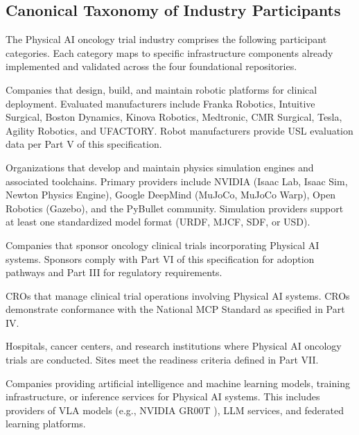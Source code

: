 \documentclass[11pt,letterpaper]{article}
\begin{document}
\subsection{Canonical Taxonomy of Industry Participants}

The Physical AI oncology trial industry comprises the following participant categories. Each category maps to specific infrastructure components already implemented and validated across the four foundational repositories.

\begin{description}[leftmargin=3.5cm, style=sameline]
  \item[Robot Manufacturers] Companies that design, build, and maintain robotic platforms for clinical deployment. Evaluated manufacturers include Franka Robotics, Intuitive Surgical, Boston Dynamics, Kinova Robotics, Medtronic, CMR Surgical, Tesla, Agility Robotics, and UFACTORY. Robot manufacturers \SHALL{} provide USL evaluation data per Part V of this specification.

  \item[Simulation Providers] Organizations that develop and maintain physics simulation engines and associated toolchains. Primary providers include NVIDIA (Isaac Lab, Isaac Sim, Newton Physics Engine), Google DeepMind (MuJoCo, MuJoCo Warp), Open Robotics (Gazebo), and the PyBullet community. Simulation providers \SHALL{} support at least one standardized model format (URDF, MJCF, SDF, or USD).

  \item[Pharmaceutical Sponsors] Companies that sponsor oncology clinical trials incorporating Physical AI systems. Sponsors \SHALL{} comply with Part VI of this specification for adoption pathways and Part III for regulatory requirements.

  \item[Contract Research Organizations] CROs that manage clinical trial operations involving Physical AI systems. CROs \SHALL{} demonstrate conformance with the National MCP Standard \cite{kawchak2026nationalmcp} as specified in Part IV.

  \item[Clinical Sites] Hospitals, cancer centers, and research institutions where Physical AI oncology trials are conducted. Sites \SHALL{} meet the readiness criteria defined in Part VII.

  \item[AI and ML Vendors] Companies providing artificial intelligence and machine learning models, training infrastructure, or inference services for Physical AI systems. This includes providers of VLA models (e.g., NVIDIA GR00T \cite{groot2026}), LLM services, and federated learning platforms.


\end{description}
\end{document}
